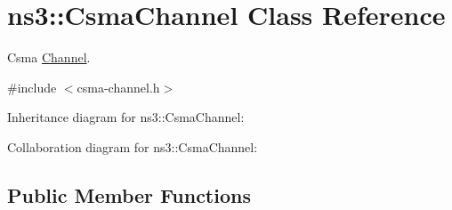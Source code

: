 \hypertarget{classns3_1_1CsmaChannel}{}\section{ns3\+:\+:Csma\+Channel Class Reference}
\label{classns3_1_1CsmaChannel}


Csma \hyperlink{classns3_1_1Channel}{Channel}.  




{\ttfamily \#include $<$csma-\/channel.\+h$>$}



Inheritance diagram for ns3\+:\+:Csma\+Channel\+:


Collaboration diagram for ns3\+:\+:Csma\+Channel\+:
\subsection*{Public Member Functions}
